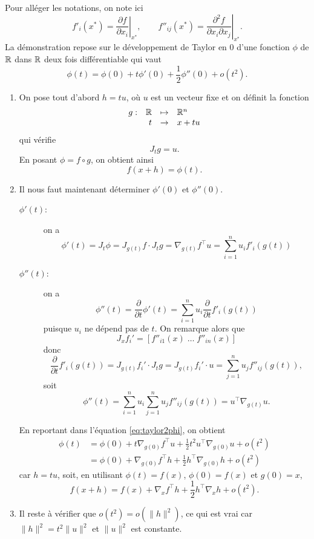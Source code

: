 \proof
  Pour alléger les notations, on note ici
  $$
  f'_i(x^*) = \left. \frac{\partial f}{\partial x_i}\right|_{x^*}, \qquad 
  f''_{ij}(x^*) = \left. \frac{\partial^2 f}{\partial x_i \partial x_j}\right|_{x^*}.
  $$
  La démonstration repose sur le développement de Taylor en 0 d'une fonction $\phi$ de $\mathbb{R}$ dans $\mathbb{R}$ deux fois différentiable qui vaut
  \begin{equation} \label{eq:taylor2phi}
  \phi(t) = \phi(0) + t \phi'(0) + \frac12 \phi''(0) + o(t^2).
  \end{equation}
  \begin{enumerate}
    \item On pose tout d'abord $h = t u$, où $u$ est un vecteur fixe et on définit la fonction 
    $$
      \begin{array}{rrcl}
        g : & \mathbb{R} & \mapsto & \mathbb{R}^n \\
        & t & \to & x + t u
      \end{array}
    $$
    qui vérifie
    $$
    J_t g = u.
    $$
    En posant $\phi = f \circ g$, on obtient ainsi
    $$
    f(x + h) = \phi(t).
    $$
    \item Il nous faut maintenant déterminer $\phi'(0)$ et $\phi''(0)$.
    \begin{description}
      \item[$\phi'(t)$:] on a
        $$
        \phi'(t) = J_t \phi 
        = J_{g(t)} f \cdot J_t g
        = \nabla_{g(t)}f^\top u
        = \sum_{i=1}^n u_i f'_i(g(t))
        $$
      \item[$\phi''(t)$:] on a
      $$
      \phi''(t) 
      = \frac{\partial}{\partial t} \phi'(t)
      = \sum_{i=1}^n u_i \frac{\partial}{\partial t} f'_i(g(t))
      $$
      puisque $u_i$ ne dépend pas de $t$. On remarque alors que
      $$
      J_x f_i' = [f''_{i1}(x) \; \dots \; f''_{in}(x)]
      $$
      donc
      $$
      \frac{\partial}{\partial t} f'_i(g(t)) 
      = J_{g(t)} f_i' \cdot J_t g
      = J_{g(t)} f_i' \cdot u
      = \sum_{j=1}^n u_j f''_{ij}(g(t)),
      $$
      soit
      $$
      \phi''(t) 
      = \sum_{i=1}^n u_i \sum_{j=1}^n u_j f''_{ij}(g(t))
      = u^\top \nabla_{g(t)} u.
      $$
    \end{description}
    En reportant dans l'équation \eqref{eq:taylor2phi}, on obtient
    \begin{align*}
      \phi(t) 
      & = \phi(0) + t \nabla_{g(0)}f^\top u + \frac12 t^2 u^\top \nabla_{g(0)} u + o(t^2) \\
      & = \phi(0) + \nabla_{g(0)}f^\top h + \frac12 h^\top \nabla_{g(0)} h + o(t^2)
    \end{align*}
    car $h = tu$, soit, en utilisant $\phi(t) = f(x)$, $\phi(0) = f(x)$ et $g(0) = x$,
    $$
    f(x+h) 
    = f(x) + \nabla_{x}f^\top h + \frac12 h^\top \nabla_{x} h + o(t^2).
    $$
    \item Il reste à vérifier que $o(t^2) = o(\|h\|^2)$, ce qui est vrai car $\|h\|^2 = t^2 \|u\|^2$ et $\|u\|^2$ est constante.
  \end{enumerate}
\eproof

